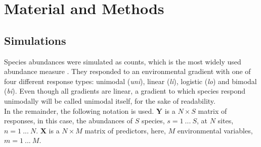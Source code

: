 

\section{Material and Methods}


	\subsection{Simulations}
		Species abundances were simulated as counts, which is the most widely used abundance measure \citep{Warton2008}.
		They responded to an environmental gradient with one of four different response types: unimodal (\textit{uni}), linear (\textit{li}), logistic (\textit{lo}) and bimodal (\textit{bi}).
		Even though all gradients are linear, a gradient to which species respond unimodally will be called unimodal itself, for the sake of readability.\\
	

		In the remainder, the following notation is used. 
		$\mathbf{Y}$ is a $N \times S$ matrix of responses, in this case, the abundances of $S$ species, $ s= 1\ ...\ S$, at $N$ sites, $ n = 1\ ...\ N$.
		$\mathbf{X}$ is a $N \times M$ matrix of predictors, here, $M$ environmental variables, $m = 1\ ... \ M$. \\
	
		
